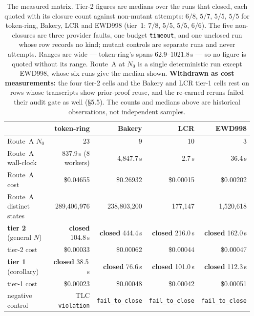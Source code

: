 \documentclass[11pt,a4paper]{article}
\begin{document}
\begin{table}[htbp]
\centering
\small
\begin{tabular}{@{}lrrrr@{}}
\toprule
 & \textbf{token-ring} & \textbf{Bakery} & \textbf{LCR} & \textbf{EWD998} \\
\midrule
Route~A $N_0$                       & 23 & 9 & 10 & 3 \\
Route~A wall-clock                  & 837.9\,s (8 workers) & 4{,}847.7\,s & 2.7\,s & 36.4\,s \\
Route~A cost                        & \$0.04655 & \$0.26932 & \$0.00015 & \$0.00202 \\
Route~A distinct states             & 289{,}406{,}976 & 238{,}803{,}200 & 177{,}147 & 1{,}520{,}618 \\
\midrule
\textbf{tier 2} (general $N$)       & \textbf{closed} 104.8\,s & \textbf{closed} 444.4\,s & \textbf{closed} 216.0\,s & \textbf{closed} 162.0\,s \\
tier-2 cost                         & \$0.00033 & \$0.00062 & \$0.00044 & \$0.00047 \\
\textbf{tier 1} (corollary)         & \textbf{closed} 38.5\,s & \textbf{closed} 76.6\,s & \textbf{closed} 101.0\,s & \textbf{closed} 112.3\,s \\
tier-1 cost                         & \$0.00023 & \$0.00048 & \$0.00042 & \$0.00051 \\
\midrule
negative control                    & TLC \texttt{violation} & \texttt{fail\_to\_close} & \texttt{fail\_to\_close} & \texttt{fail\_to\_close} \\
\bottomrule
\end{tabular}
\caption{The measured matrix. Tier-2 figures are medians over the runs that closed, each quoted with
its closure count against non-mutant attempts: $6/8$, $5/7$, $5/5$, $5/5$ for token-ring, Bakery, LCR
and EWD998 (tier~1: $7/8$, $5/5$, $5/5$, $6/6$). The five non-closures are three provider faults, one
budget \texttt{timeout}, and one unclosed run whose row records no kind; mutant controls are separate
runs and never attempts. Ranges are wide --- token-ring's spans 62.9--1021.8\,s --- so no figure is
quoted without its range. Route~A at $N_0$ is a single deterministic run except EWD998, whose six runs
give the median shown. \textbf{Withdrawn as cost measurements:} the four tier-2 cells and the Bakery and
LCR tier-1 cells rest on rows whose transcripts show prior-proof reuse, and the re-earned reruns failed
their audit gate as well (\S5.5). The counts and medians above are historical observations, not
independent samples.}
\end{table}
\end{document}
